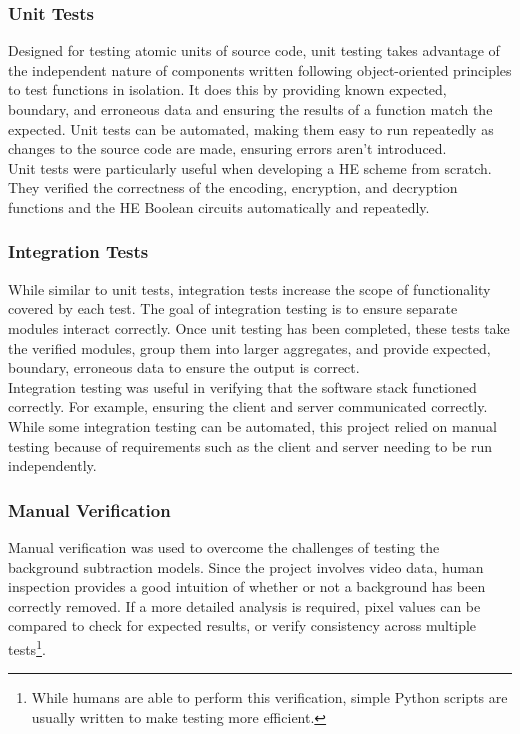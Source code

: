 \setlength{\leftskip}{0cm}
\subsubsection{Unit Tests}
\setlength{\leftskip}{0.5cm}
\indent \indent
Designed for testing atomic units of source code, unit testing takes advantage of the independent nature of components written following object-oriented principles to test functions in isolation. It does this by providing known expected, boundary, and erroneous data and ensuring the results of a function match the expected. Unit tests can be automated, making them easy to run repeatedly as changes to the source code are made, ensuring errors aren't introduced.
\smallskip \\ \indent
Unit tests were particularly useful when developing a HE scheme from scratch. They verified the correctness of the encoding, encryption, and decryption functions and the HE Boolean circuits automatically and repeatedly.

\setlength{\leftskip}{0cm}
\subsubsection{Integration Tests}
\setlength{\leftskip}{0.5cm}
\indent \indent
While similar to unit tests, integration tests increase the scope of functionality covered by each test. The goal of integration testing is to ensure separate modules interact correctly. Once unit testing has been completed, these tests take the verified modules, group them into larger aggregates, and provide expected, boundary, erroneous data to ensure the output is correct.
\smallskip \\ \indent
Integration testing was useful in verifying that the software stack functioned correctly. For example, ensuring the client and server communicated correctly. While some integration testing can be automated, this project relied on manual testing because of requirements such as the client and server needing to be run independently.

\setlength{\leftskip}{0cm}
\subsubsection{Manual Verification}
\setlength{\leftskip}{0.5cm}
\indent \indent
Manual verification was used to overcome the challenges of testing the background subtraction models. Since the project involves video data, human inspection provides a good intuition of whether or not a background has been correctly removed. If a more detailed analysis is required, pixel values can be compared to check for expected results, or verify consistency across multiple tests\footnote{While humans are able to perform this verification, simple Python scripts are usually written to make testing more efficient.}. 

